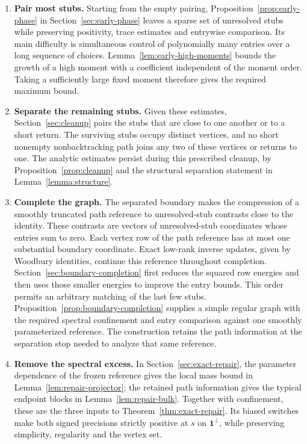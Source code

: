 \begin{enumerate}
\item \textbf{Pair most stubs.}
Starting from the empty pairing,
Proposition~\ref{prop:early-phase} in Section~\ref{sec:early-phase}
leaves a sparse set of unresolved stubs while preserving positivity,
trace estimates and entrywise comparison. Its main difficulty is simultaneous control
of polynomially many entries over a long sequence of choices.
Lemma~\ref{lem:early-high-moments} bounds the growth of a high moment
with a coefficient independent of the moment order. Taking a
sufficiently large fixed moment therefore gives the required maximum
bound.

\item \textbf{Separate the remaining stubs.}
Given these estimates, Section~\ref{sec:cleanup} pairs the stubs that are close to one another
or to a short return. The surviving stubs occupy distinct vertices,
and no short nonempty nonbacktracking path joins any two of these vertices or
returns to one. The analytic estimates persist during this prescribed
cleanup, by Proposition~\ref{prop:cleanup} and the structural
separation statement in Lemma~\ref{lemma:structure}.

\item \textbf{Complete the graph.}
The separated boundary makes the compression of a smoothly truncated path
reference to unresolved-stub contrasts close to the identity. These contrasts
are vectors of unresolved-stub coordinates whose entries sum to zero. Each vertex row of the
path reference has at most one substantial boundary
coordinate. Exact low-rank inverse updates, given by Woodbury identities,
continue this reference throughout completion.
Section~\ref{sec:boundary-completion} first reduces the squared row
energies and then uses those smaller energies to improve the entry
bounds. This order permits an arbitrary matching of the last few stubs.
Proposition~\ref{prop:boundary-completion} supplies a simple regular
graph with the required spectral confinement and entry comparison
against one smoothly parameterized reference. The construction retains
the path information at the separation stop needed to analyze that
same reference.

\item \textbf{Remove the spectral excess.}
In Section~\ref{sec:exact-repair}, the parameter dependence of the frozen
reference gives the local mass bound in Lemma~\ref{lem:repair-projector};
the retained path information gives the typical endpoint blocks in
Lemma~\ref{lem:repair-bulk}. Together with confinement, these are the
three inputs to Theorem~\ref{thm:exact-repair}. Its biased switches
make both signed precisions strictly positive at $s$ on
$\mathbf1^\perp$, while preserving simplicity, regularity and the
vertex set.
\end{enumerate}

